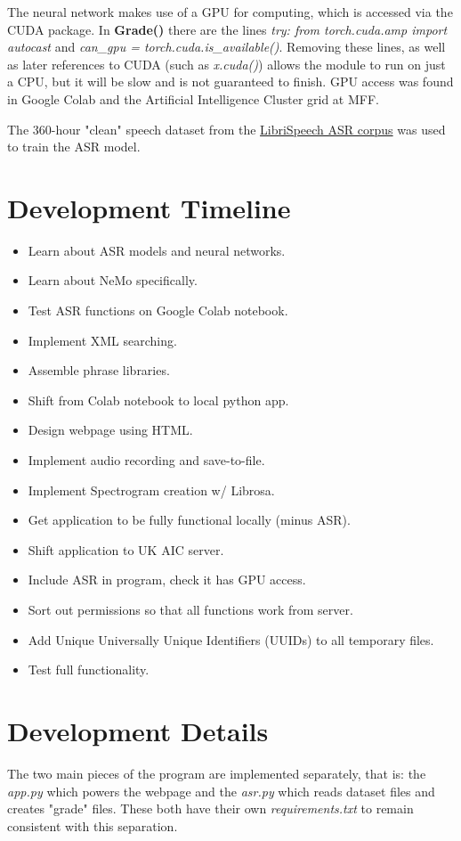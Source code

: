 \documentclass[12pt, letterpaper]{article}
\begin{document}
The neural network makes use of a GPU for computing, which is accessed via the CUDA package. In \textbf{Grade()} there are the lines \textit{try: from torch.cuda.amp import autocast} and \textit{can\_gpu = torch.cuda.is\_available()}. Removing these lines, as well as later references to CUDA (such as \textit{x.cuda()}) allows the module to run on just a CPU, but it will be slow and is not guaranteed to finish. GPU access was found in Google Colab and the Artificial Intelligence Cluster grid at MFF.

The 360-hour "clean" speech dataset from the \href{http://www.openslr.org/12/}{LibriSpeech ASR corpus} was used to train the ASR model.

\section*{Development Timeline}
\begin{itemize}
\item{Learn about ASR models and neural networks.}
\item{Learn about NeMo specifically.}
\item{Test ASR functions on Google Colab notebook.}
\item{Implement XML searching.}
\item{Assemble phrase libraries.}
\item{Shift from Colab notebook to local python app.}
\item{Design webpage using HTML.}
\item{Implement audio recording and save-to-file.}
\item{Implement Spectrogram creation w/ Librosa.}
\item{Get application to be fully functional locally (minus ASR).}
\item{Shift application to UK AIC server.}
\item{Include ASR in program, check it has GPU access.}
\item{Sort out permissions so that all functions work from server.}
\item{Add Unique Universally Unique Identifiers (UUIDs) to all temporary files.}
\item{Test full functionality.}
\end{itemize}
\newpage%


\section*{Development Details}
The two main pieces of the program are implemented separately, that is: the \textit{app.py} which powers the webpage and the \textit{asr.py} which reads dataset files and creates "grade" files. These both have their own \textit{requirements.txt} to remain consistent with this separation. 
\end{document}
